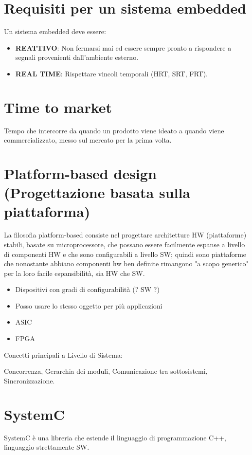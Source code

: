 \documentclass[a4paper]{article}
\begin{document}
	\section{Requisiti per un sistema embedded}
	Un sistema embedded deve essere:
	\begin{itemize}
		\item \textbf{REATTIVO}: Non fermarsi mai ed essere sempre pronto a rispondere a segnali provenienti dall'ambiente esterno.
		\item \textbf{REAL TIME}: Rispettare vincoli temporali (HRT, SRT, FRT).
	\end{itemize}
	
	
	\section{Time to market}
		Tempo che intercorre da quando un prodotto viene ideato a quando viene commercializzato, messo sul mercato per la prima volta.


	\section{Platform-based design (Progettazione basata sulla piattaforma)}
		La filosofia platform-based consiste nel progettare architetture HW (piattaforme) stabili, basate su microprocessore, che possano essere facilmente espanse a livello di componenti HW e che sono configurabili a livello SW; quindi sono piattaforme che nonostante abbiano componenti hw ben definite rimangono "a scopo generico" per la loro facile espansibilità, sia HW che SW.

		
		\begin{itemize}
			\item Dispositivi con gradi di configurabilità (? SW ?)
			\item Posso usare lo stesso oggetto per più applicazioni 
			\item ASIC
			\item FPGA 
		\end{itemize}
	
	Concetti principali a Livello di Sistema:
	
	Concorrenza, Gerarchia dei moduli, Comunicazione tra sottosistemi, Sincronizzazione.
	
	\section{SystemC}
		SystemC è una libreria che estende il linguaggio di programmazione C++, linguaggio strettamente SW.
		\bigskip
		
\end{document}
